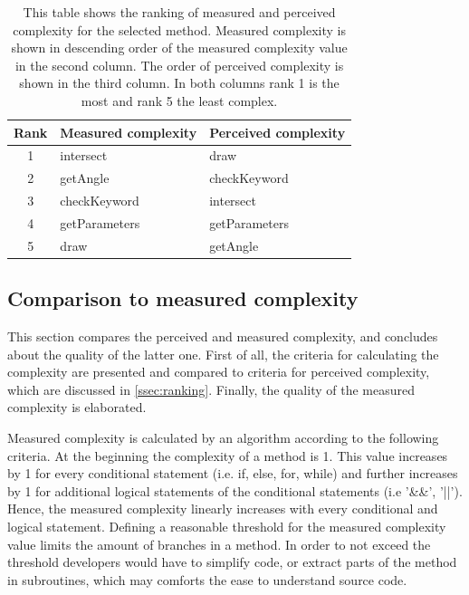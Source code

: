 \documentclass[conference]{IEEEtran}
\begin{document}
\begin{table}
\centering
	\begin{tabular}{c | l l}
		Rank 	& Measured complexity   & Perceived complexity      \\ \hline 
		1 		& intersect	            & draw                      \\ 
		2 		& getAngle       	    & checkKeyword              \\ 
		3 		& checkKeyword  	    & intersect                 \\ 
		4 		& getParameters         & getParameters             \\ 
		5 		& draw 		            & getAngle                  \\ 
	\end{tabular} 
\caption{This table shows the ranking of measured and perceived complexity for the selected method. Measured complexity is shown in descending order of the measured complexity value in the second column. The order of perceived complexity is shown in the third column. In both columns rank 1 is the most and rank 5 the least complex.}
\label{tbl:ranking}
\end{table}

\subsection{Comparison to measured complexity}
\label{ssec:comparison}
This section compares the perceived and measured complexity, and concludes about the quality of the latter one. First of all, the criteria for calculating the complexity are presented and compared to criteria for perceived complexity, which are discussed in \cref{ssec:ranking}. Finally, the quality of the measured complexity is elaborated.

Measured complexity is calculated by an algorithm according to the following criteria. At the beginning the complexity of a method is 1. This value increases by 1 for every conditional statement (i.e. if, else, for, while) and further increases by 1 for additional logical statements of the conditional statements (i.e '\&\&', '||'). Hence, the measured complexity linearly increases with every conditional and logical statement. Defining a reasonable threshold for the measured complexity value limits the amount of branches in a method. In order to not exceed the threshold developers would have to simplify code, or extract parts of the method in subroutines, which may comforts the ease to understand source code.
\end{document}
